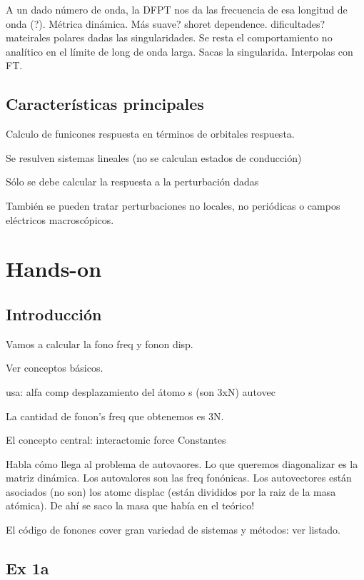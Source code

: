   A un dado número de onda, la DFPT nos da las frecuencia de esa longitud de onda (?). Métrica dinámica. Más suave? shoret dependence. dificultades? mateirales polares dadas las singularidades. Se resta el comportamiento no analítico en el límite de long de onda larga. Sacas la singularida. Interpolas con FT.

\subsection{Características principales}

  Calculo de funicones respuesta en términos de orbitales respuesta.

  Se resulven sistemas lineales (no se calculan estados de conducción)

  Sólo se debe calcular la respuesta a la perturbación dadas

  También se pueden tratar perturbaciones no locales, no periódicas o campos eléctricos macroscópicos.

\section{Hands-on}

\subsection{Introducción}

    Vamos a calcular la fono freq y fonon disp.

    Ver conceptos básicos.

    usa: alfa comp desplazamiento del átomo s (son 3xN) autovec

    La cantidad de fonon's freq que obtenemos es 3N.

    El concepto central: interactomic force Constantes

    Habla cómo llega al problema de autovaores. Lo que queremos diagonalizar es la matriz dinámica. Los autovalores son las freq fonónicas. Los autovectores están asociados (no son) los atomc displac (están divididos por la raiz de la masa atómica). De ahí se saco la masa que había en el teórico!

    El código de fonones cover gran variedad de sistemas y métodos: ver listado.

\subsection{Ex 1a}

